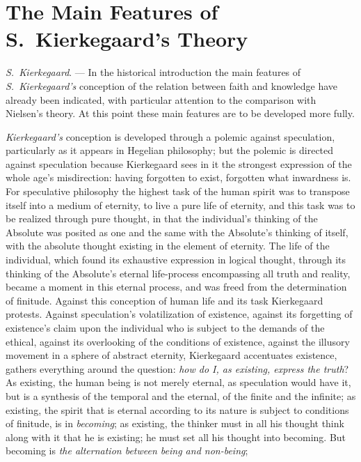 \documentclass[12pt,a4paper]{book}
\begin{document}
\section{The Main Features of S.\ Kierkegaard's Theory}
\label{sec:kierkegaard}

\emph{S.\ Kierkegaard}. --- In the historical introduction the main features of \emph{S.\ Kierkegaard's}
conception of the relation between faith and knowledge have already
been indicated, with particular attention to the comparison with
Nielsen's theory. At this point these main features are to be
developed more fully.

\emph{Kierkegaard's} conception is developed through a polemic against
speculation, particularly as it appears in Hegelian philosophy; but the
polemic is directed against speculation because Kierkegaard sees in it
the strongest expression of the whole age's misdirection: having
forgotten to exist, forgotten what inwardness is. For speculative
philosophy the highest task of the human spirit was to transpose itself
into a medium of eternity, to live a pure life of eternity, and this
task was to be realized through pure thought, in that the individual's
thinking of the Absolute was posited as one and the same with the
Absolute's thinking of itself, with the absolute thought existing in
the element of eternity. The life of the individual, which found its
exhaustive expression in logical thought, through its thinking of the
Absolute's eternal life-process encompassing all truth and reality,
became a moment in this eternal process, and was freed from the
determination of finitude. Against this conception of human life and its
task Kierkegaard protests. Against speculation's volatilization of
existence, against its forgetting of existence's claim upon the
individual who is subject to the demands of the ethical, against its
overlooking of the conditions of existence, against the illusory movement
in a sphere of abstract eternity, Kierkegaard accentuates existence,
gathers everything around the question: \emph{how do I, as existing, express
the truth}? As existing, the human being is not merely eternal, as
speculation would have it, but is a synthesis of the temporal and the
eternal, of the finite and the infinite; as existing, the spirit that
is eternal according to its nature is subject to conditions of finitude,
is in \emph{becoming}; as existing, the thinker must in all his thought think
along with it that he is existing; he must set all his thought into
becoming. But becoming is \emph{the alternation between being and non-being};
\end{document}
